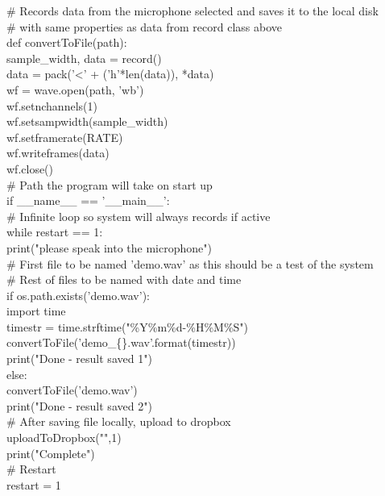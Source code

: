 \documentclass[a4paper,11pt]{report}
\begin{document}
\# Records data from the microphone selected and saves it to the local disk \\
\# with same properties as data from record class above \\
def convertToFile(path):\\
    sample\_width, data = record()\\
    data = pack('<' + ('h'*len(data)), *data)\\

    wf = wave.open(path, 'wb')\\
    wf.setnchannels(1)\\
    wf.setsampwidth(sample\_width)\\
    wf.setframerate(RATE)\\
    wf.writeframes(data)\\
    wf.close()\\

\# Path the program will take on start up\\
if \_\_name\_\_ == '\_\_main\_\_':   \\
    \# Infinite loop so system will always records if active \\
    while restart == 1:\\
        print("please speak into the microphone")\\

        \# First file to be named 'demo.wav' as this should be a test of the system \\
        \# Rest of files to be named with date and time\\
        if os.path.exists('demo.wav'):\\
            import time\\
            timestr = time.strftime("\%Y\%m\%d-\%H\%M\%S")\\
            convertToFile('demo\_\{\}.wav'.format(timestr))\\
            print("Done - result saved 1")\\
        else:\\
            convertToFile('demo.wav')\\
            print("Done - result saved 2")\\

        \# After saving file locally, upload to dropbox\\
        uploadToDropbox("",1)\\

        print("Complete")\\

        \# Restart\\
        restart = 1\\
\end{document}
